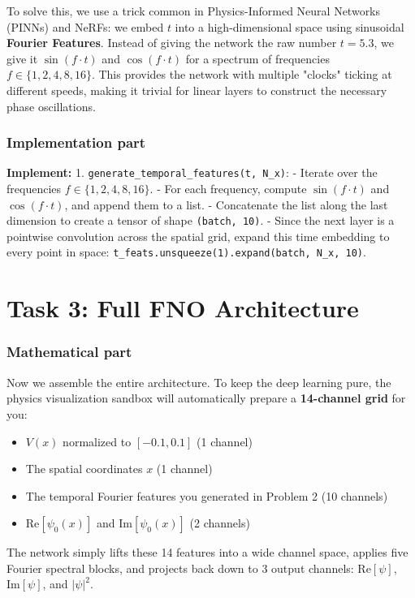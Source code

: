 \documentclass[11pt]{article}
\begin{document}
To solve this, we use a trick common in Physics-Informed Neural Networks (PINNs) and NeRFs: we embed $t$ into a high-dimensional space using sinusoidal \textbf{Fourier Features}. Instead of giving the network the raw number $t=5.3$, we give it $\sin(f \cdot t)$ and $\cos(f \cdot t)$ for a spectrum of frequencies $f \in \{1, 2, 4, 8, 16\}$. This provides the network with multiple "clocks" ticking at different speeds, making it trivial for linear layers to construct the necessary phase oscillations.

\subsubsection*{Implementation part}
\textbf{Implement:}
1. \lstinline|generate_temporal_features(t, N_x)|:
    - Iterate over the frequencies $f \in \{1, 2, 4, 8, 16\}$.
    - For each frequency, compute $\sin(f \cdot t)$ and $\cos(f \cdot t)$, and append them to a list.
    - Concatenate the list along the last dimension to create a tensor of shape \lstinline|(batch, 10)|.
    - Since the next layer is a pointwise convolution across the spatial grid, expand this time embedding to every point in space: \lstinline|t_feats.unsqueeze(1).expand(batch, N_x, 10)|.

\section*{Task 3: Full FNO Architecture}

\subsubsection*{Mathematical part}
Now we assemble the entire architecture. To keep the deep learning pure, the physics visualization sandbox will automatically prepare a \textbf{14-channel grid} for you:
\begin{itemize}
    \item $V(x)$ normalized to $[-0.1, 0.1]$ (1 channel)
    \item The spatial coordinates $x$ (1 channel)
    \item The temporal Fourier features you generated in Problem 2 (10 channels)
    \item $\text{Re}[\psi_0(x)]$ and $\text{Im}[\psi_0(x)]$ (2 channels)
\end{itemize}

The network simply lifts these 14 features into a wide channel space, applies five Fourier spectral blocks, and projects back down to 3 output channels: $\text{Re}[\psi]$, $\text{Im}[\psi]$, and $|\psi|^2$.
\end{document}
